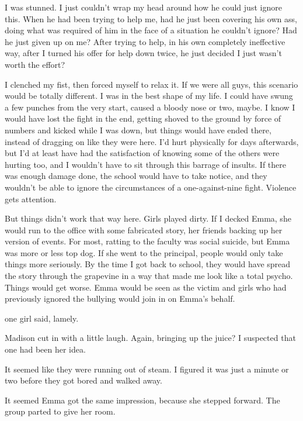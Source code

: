 I was stunned. I just couldn't wrap my head around how he could just ignore this. When he had been trying to help me, had he just been covering his own ass, doing what was required of him in the face of a situation he couldn't ignore? Had he just given up on me? After trying to help, in his own completely ineffective way, after I turned his offer for help down twice, he just decided I just wasn't worth the effort?


I clenched my fist, then forced myself to relax it. If we were all guys, this scenario would be totally different. I was in the best shape of my life. I could have swung a few punches from the very start, caused a bloody nose or two, maybe. I know I would have lost the fight in the end, getting shoved to the ground by force of numbers and kicked while I was down, but things would have ended there, instead of dragging on like they were here. I'd hurt physically for days afterwards, but I'd at least have had the satisfaction of knowing some of the others were hurting too, and I wouldn't have to sit through this barrage of insults. If there was enough damage done, the school would have to take notice, and they wouldn't be able to ignore the circumstances of a one-against-nine fight. Violence gets attention.

But things didn't work that way here. Girls played dirty. If I decked Emma, she would run to the office with some fabricated story, her friends backing up her version of events. For most, ratting to the faculty was social suicide, but Emma was more or less top dog. If she went to the principal, people would only take things more seriously. By the time I got back to school, they would have spread the story through the grapevine in a way that made me look like a total psycho. Things would get worse. Emma would be seen as the victim and girls who had previously ignored the bullying would join in on Emma's behalf.

 one girl said, lamely.

 Madison cut in with a little laugh. Again, bringing up the juice? I suspected that one had been her idea.

It seemed like they were running out of steam. I figured it was just a minute or two before they got bored and walked away.

It seemed Emma got the same impression, because she stepped forward. The group parted to give her room.

